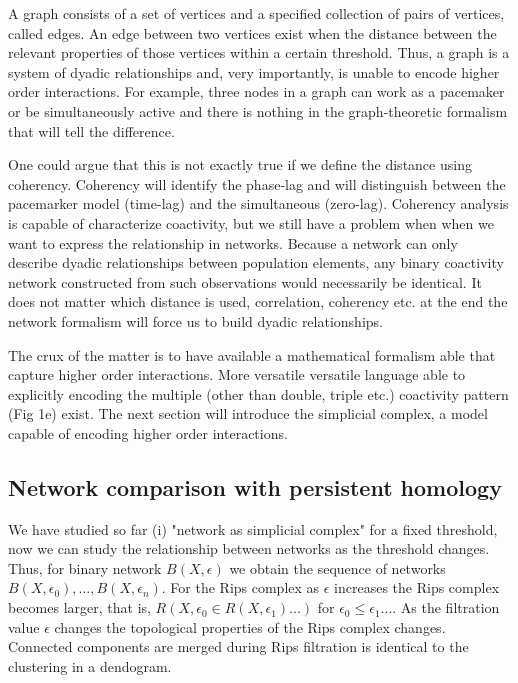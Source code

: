\documentclass[onecollarge,runningheads]{svjour2}
\begin{document}
A graph consists of a set of vertices and a specified collection of pairs of vertices, called edges. An edge between two vertices exist when the distance between the relevant properties of those vertices within a certain threshold. Thus, a graph is a system of dyadic relationships and, very importantly, is unable to encode higher order interactions. For example, three nodes in a graph can work as a pacemaker or be simultaneously active and there is nothing in the graph-theoretic formalism that will tell the difference.

One could argue that this is not exactly true if we define the distance using coherency.
Coherency will identify the phase-lag and will distinguish between the pacemarker model (time-lag) and the simultaneous (zero-lag). %
Coherency analysis is capable of characterize coactivity, but we still have a problem when   when we want to express the relationship in networks. Because a network can only describe dyadic relationships between population elements, any binary coactivity network constructed from such observations would necessarily be identical. 
It does not matter which distance is used, correlation, coherency etc. at the end the network formalism will force us to build dyadic relationships.

The crux of the matter is to have available a mathematical formalism able that capture higher order interactions. More versatile versatile language able to explicitly encoding the multiple (other than double, triple etc.) coactivity pattern (Fig 1e) exist. 
The next section will introduce the simplicial complex, a model capable of encoding higher order interactions.%
 
\subsection{Network comparison with persistent homology}
\label{sec:ph}

We have studied so far (i) "network as simplicial complex" for a fixed threshold, now we can study the relationship between networks as the threshold changes. Thus, for  binary network $B(X,\epsilon)$ we obtain the sequence of networks $B(X,\epsilon_0), ...,B(X,\epsilon_n)$. For the Rips complex as $\epsilon$ increases the Rips complex becomes larger, that is, $R(X,\epsilon_0 \in R(X,\epsilon_1) ...)$ for $\epsilon_0 \leq \epsilon_1 ...$. As the filtration value $\epsilon$ changes the topological properties of the Rips complex changes. Connected components are merged during Rips filtration is identical to the clustering in a dendogram.
\end{document}
